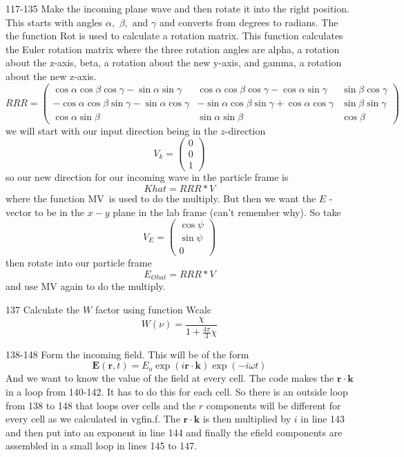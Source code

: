 \documentclass{article}
\begin{document}
117-135 Make the incoming plane wave and then rotate it into the right
position. This starts with angles $\alpha ,$ $\beta ,$ and $\gamma $ and
converts from degrees to radians. The the function Rot is used to calculate
a rotation matrix. This function calculates the Euler rotation matrix where
the three rotation angles are alpha, a rotation about the z-axis, beta, a
rotation about the new y-axis, and gamma, a rotation about the new z-axis. 
\[
RRR=\left( 
\begin{array}{ccc}
\cos \alpha \cos \beta \cos \gamma -\sin \alpha \sin \gamma & \cos \alpha
\cos \beta \cos \gamma -\cos \alpha \sin \gamma & \sin \beta \cos \gamma \\ 
-\cos \alpha \cos \beta \sin \gamma -\sin \alpha \cos \gamma & -\sin \alpha
\cos \beta \sin \gamma +\cos \alpha \cos \gamma & \sin \beta \sin \gamma \\ 
\cos \alpha \sin \beta & \sin \alpha \sin \beta & \cos \beta%
\end{array}%
\right) 
\]%
we will start with our input direction being in the $z$-direction%
\[
V_{k}=\left( 
\begin{array}{c}
0 \\ 
0 \\ 
1%
\end{array}%
\right) 
\]%
so our new direction for our incoming wave in the particle frame is 
\[
Khat=RRR\ast V 
\]%
where the function MV\ is used to do the multiply. But then we want the $E$%
-vector to be in the $x-y$ plane in the lab frame (can't remember why). So
take 
\[
V_{E}=\left( 
\begin{array}{c}
\cos \psi \\ 
\sin \psi \\ 
0%
\end{array}%
\right) 
\]%
then rotate into our particle frame%
\[
E_{Ohat}=RRR\ast V 
\]%
and use MV again to do the multiply.

137 Calculate the $W$ factor using function Wcalc%
\[
W\left( \nu \right) =\frac{\chi }{1+\frac{4\pi }{3}\chi } 
\]

138-148 Form the incoming field. This will be of the form 
\[
\mathbf{E}\left( \mathbf{r},t\right) =E_{o}\exp \left( i\mathbf{r}\cdot 
\mathbf{k}\right) \exp (-i\omega t) 
\]%
And we want to know the value of the field at every cell. The code makes the 
$\mathbf{r}\cdot \mathbf{k}$ in a loop from 140-142. It has to do this for
each cell. So there is an outside loop from 138 to 148 that loops over cells
and the $r$ components will be different for every cell as we calculated in
vgfin.f. The $\mathbf{r}\cdot \mathbf{k}$ is then multiplied by $i$ in line
143 and then put into an exponent in line 144 and finally the efield
components are assembled in a small loop in lines 145 to 147.
\end{document}
